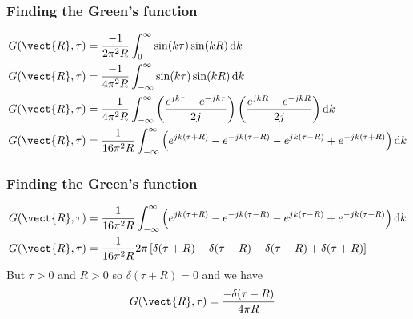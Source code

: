 \documentclass[12 pt, compress, handout, intlimits]{beamer}
\renewcommand{\d}{\operatorname{d}\!}
\begin{document}

\begin{frame}[fragile]
    \frametitle{Finding the Green's function}

    \begin{align*}
        G(\vect{R},\tau) &= \frac{-1}{2 \pi^2 R} \int_0^\infty \sin(k \tau) \sin(k R) \d k
        \\
        G(\vect{R},\tau) &= \frac{-1}{4 \pi^2 R} \int_{-\infty}^\infty \sin(k \tau) \sin(k R) \d k
        \\
        G(\vect{R},\tau) &= \frac{-1}{4 \pi^2 R} \int_{-\infty}^\infty \left( \frac{e^{j k \tau} - e^{-j k \tau}}{2 j}\right) \left( \frac{e^{j k R} - e^{-j k R}}{2j}\right) \d k
        \\
        G(\vect{R},\tau) &= \frac{1}{16 \pi^2 R} \int_{-\infty}^\infty \left( e^{j k (\tau + R)} - e^{-j k (\tau - R)} - e^{j k (\tau - R)} + e^{-j k (\tau + R)} \right) \d k
    \end{align*}
    
\end{frame}


\begin{frame}[fragile]
    \frametitle{Finding the Green's function}
    
    \begin{align*}
        G(\vect{R},\tau) &= \frac{1}{16 \pi^2 R} \int_{-\infty}^\infty \left( e^{j k (\tau + R)} - e^{-j k (\tau - R)} - e^{j k (\tau - R)} + e^{-j k (\tau + R)} \right) \d k
        \\
        G(\vect{R},\tau) &= \frac{1}{16 \pi^2 R} 2 \pi \left[ \delta(\tau + R) - \delta(\tau - R) - \delta(\tau - R) + \delta(\tau + R) \right]
    \end{align*}
    But $ \tau > 0 $ and $ R > 0 $ so $ \delta(\tau + R) = 0 $ and we have
    \begin{align*}
        G(\vect{R},\tau) &= \frac{- \delta(\tau - R)}{4 \pi R}
    \end{align*}
    
\end{frame}
\end{document}
